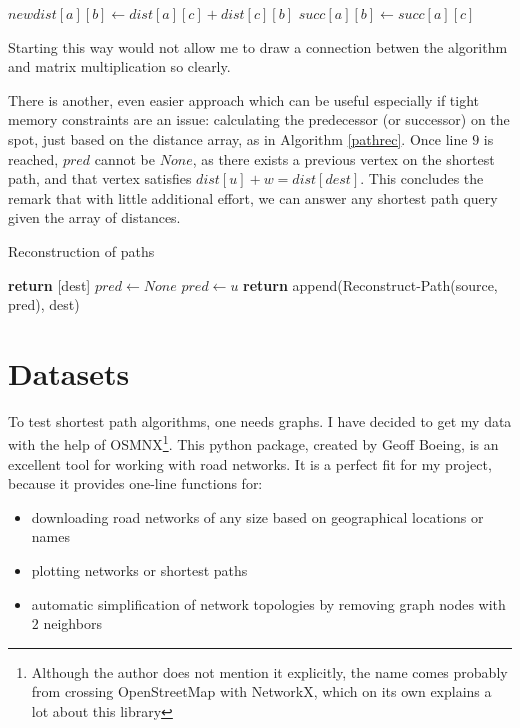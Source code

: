 \documentclass[12pt,a4paper,oneside,openright]{report}
\begin{document}
\begin{algorithm}
\begin{algorithmic}[1]
        \State $newdist[a][b] \gets dist[a][c] + dist[c][b]$
        \State $succ[a][b] \gets succ[a][c]$
    \EndIf
\end{algorithmic}
\end{algorithm}
Starting this way would not allow me to draw a connection betwen the algorithm and matrix multiplication so clearly.

There is another, even easier approach which can be useful especially if tight memory constraints are an issue: calculating the predecessor (or successor) on the spot, just based on the distance array, as in Algorithm \ref{pathrec}. Once line $9$ is reached, $pred$ cannot be $None$, as there exists a previous vertex on the shortest path, and that vertex satisfies $dist[u] + w = dist[dest]$. This concludes the remark that with little additional effort, we can answer any shortest path query given the array of distances.

\begin{algorithm}
\caption{Reconstruction of paths}\label{pathrec}
\begin{algorithmic}[1]
\State \textbf{return} [dest]
\Else
    \State $pred \gets None$
    \State $pred \gets u$
    \EndIf
    \EndFor
    \State \textbf{return} append(Reconstruct-Path(source, pred), dest)
\EndIf
\EndProcedure
\end{algorithmic}
\end{algorithm}

\section{Datasets}
To test shortest path algorithms, one needs graphs. I have decided to get my data with the help of OSMNX\cite{Boeing2017}\footnote{Although the author does not mention it explicitly, the name comes probably from crossing OpenStreetMap with NetworkX, which on its own explains a lot about this library}. This python package, created by Geoff Boeing, is an excellent tool for working with road networks. It is a perfect fit for my project, because it provides one-line functions for:
\begin{itemize}
    \item downloading road networks of any size based on geographical locations or names
    \item plotting networks or shortest paths
    \item automatic simplification of network topologies by removing graph nodes with $2$ neighbors
\end{itemize} 
\end{document}
